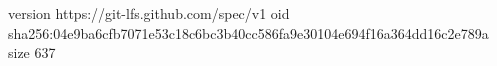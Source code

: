 version https://git-lfs.github.com/spec/v1
oid sha256:04e9ba6cfb7071e53c18c6bc3b40cc586fa9e30104e694f16a364dd16c2e789a
size 637
